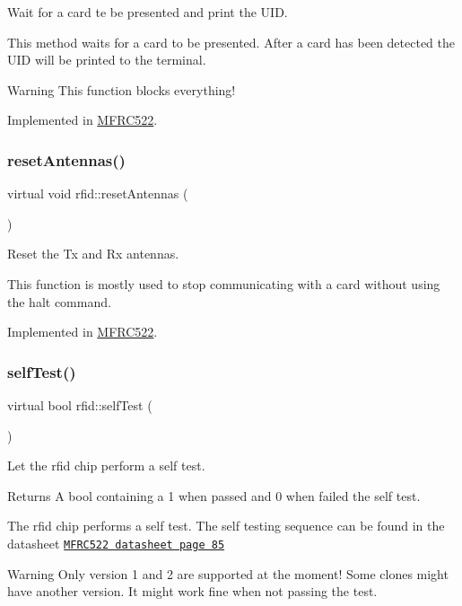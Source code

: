 Wait for a card te be presented and print the U\+ID. 

This method waits for a card to be presented. After a card has been detected the U\+ID will be printed to the terminal. \begin{DoxyWarning}{Warning}
This function blocks everything! 
\end{DoxyWarning}


Implemented in \mbox{\hyperlink{class_m_f_r_c522_aee85264d7411b76a3b0817622b428827}{M\+F\+R\+C522}}.

\mbox{\label{classrfid_abf4826e77ab7b02f04c8f01d969149c1}} 
\subsubsection{\texorpdfstring{reset\+Antennas()}{resetAntennas()}}
{\footnotesize\ttfamily virtual void rfid\+::reset\+Antennas (\begin{DoxyParamCaption}{ }\end{DoxyParamCaption})\hspace{0.3cm}{\ttfamily [pure virtual]}}



Reset the Tx and Rx antennas. 

This function is mostly used to stop communicating with a card without using the halt command. 

Implemented in \mbox{\hyperlink{class_m_f_r_c522_ac981022cc3ae79f727b2365e309cf691}{M\+F\+R\+C522}}.

\mbox{\label{classrfid_a93e5430380a14fd652e7ca1ce6443198}} 
\subsubsection{\texorpdfstring{self\+Test()}{selfTest()}}
{\footnotesize\ttfamily virtual bool rfid\+::self\+Test (\begin{DoxyParamCaption}{ }\end{DoxyParamCaption})\hspace{0.3cm}{\ttfamily [pure virtual]}}



Let the rfid chip perform a self test. 

\begin{DoxyReturn}{Returns}
A bool containing a 1 when passed and 0 when failed the self test.
\end{DoxyReturn}
The rfid chip performs a self test. The self testing sequence can be found in the datasheet \href{https://www.nxp.com/docs/en/data-sheet/MFRC522.pdf}{\tt M\+F\+R\+C522 datasheet page 85} \begin{DoxyWarning}{Warning}
Only version 1 and 2 are supported at the moment! Some clones might have another version. It might work fine when not passing the test. 
\end{DoxyWarning}


